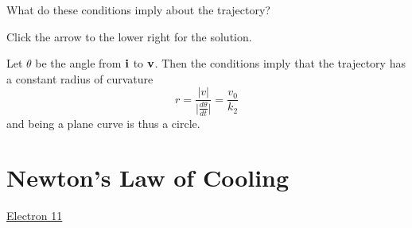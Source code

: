 \documentclass{ximera}
\begin{document}
\begin{question}  \label{Qdtg4th5yg5}
What do these conditions imply about the trajectory?

\begin{explanation}
Click the arrow to the lower right for the solution.

\begin{expandable}
Let $\theta$ be the angle from ${\bf i}$ to ${\bf v}$. Then the conditions imply that the trajectory has a constant radius of curvature 
\[
  r = \frac{|v|}{\Big|\frac{d\theta}{dt} \Big|} = \frac{v_0}{k_2} 
\]
and being a plane curve is thus a circle.
\end{expandable}
\end{explanation}

\end{question} 



\section{Newton's Law of Cooling}



\begin{exploration} \label{Edgvb5rthh}

\begin{onlineOnly}
    \begin{center}
\end{center}
\end{onlineOnly}

\href{https://www.desmos.com/calculator/yebumxuwms}{Electron 11}


\end{exploration}
\end{document}
